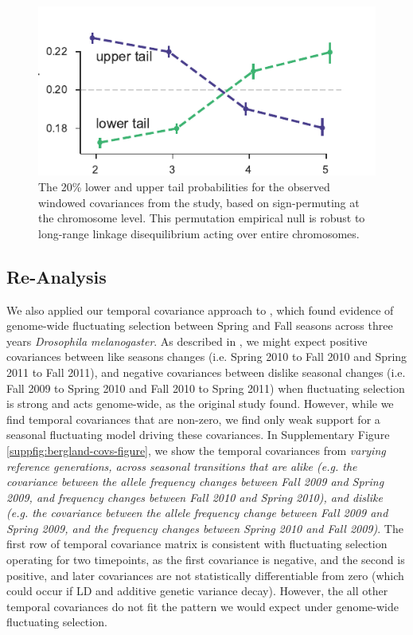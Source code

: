 \documentclass[11pt]{article}
\newcommand{\vb}[1]{{\it \color{blue} #1}}
\begin{document}
\begin{figure}[!ht]
  \centering

  \includegraphics[]{figures/barghi-tailprobs-seqid-20.pdf}

  \caption{The 20\% lower and upper tail probabilities for the observed
  windowed covariances from the \textcite{Barghi2019-qy} study, based on
  sign-permuting at the chromosome level. This permutation empirical null
  is robust to long-range linkage disequilibrium acting over entire chromosomes.}
  
  \label{suppfig:barghi-tailprobs-seqid}
\end{figure}

\subsection{\textcite{Bergland2014-ij} Re-Analysis}


We also applied our temporal covariance approach to \textcite{Bergland2014-ij},
which found evidence of genome-wide fluctuating selection between Spring and
Fall seasons across three years \emph{Drosophila melanogaster}. As described in
\textcite{Buffalo2019-io}, we might expect positive covariances between like
seasons changes (i.e. Spring 2010 to Fall 2010 and Spring 2011 to Fall 2011),
and negative covariances between dislike seasonal changes (i.e. Fall 2009 to
Spring 2010 and Fall 2010 to Spring 2011) when fluctuating selection is strong
and acts genome-wide, as the original study found. However, while we find
temporal covariances that are non-zero, we find only weak support for a
seasonal fluctuating model driving these covariances.  In Supplementary Figure
\ref{suppfig:bergland-covs-figure}, we show the temporal covariances from
\vb{varying reference generations, across seasonal transitions that are alike
  (e.g.  the covariance between the allele frequency changes between Fall 2009
  and Spring 2009, and frequency changes between Fall 2010 and Spring 2010),
and dislike (e.g. the covariance between the allele frequency change between
Fall 2009 and Spring 2009, and the frequency changes between Spring 2010 and
Fall 2009)}. The first row of temporal covariance matrix is consistent with
fluctuating selection operating for two timepoints, as the first covariance is
negative, and the second is positive, and later covariances are not
statistically differentiable from zero (which could occur if LD and additive
genetic variance decay). However, the all other temporal covariances do not fit
the pattern we would expect under genome-wide fluctuating selection.
\end{document}
